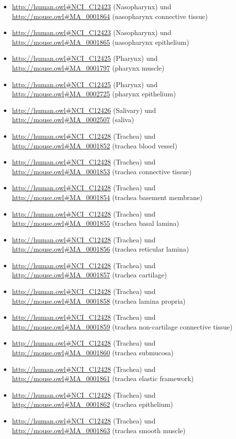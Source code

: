 \begin{itemize}
	\item \url{http://human.owl#NCI_C12423} (Nasopharynx) und \url{http://mouse.owl#MA_0001864} (nasopharynx connective tissue)
	\item \url{http://human.owl#NCI_C12423} (Nasopharynx) und \url{http://mouse.owl#MA_0001865} (nasopharynx epithelium)
	\item \url{http://human.owl#NCI_C12425} (Pharynx) und \url{http://mouse.owl#MA_0001797} (pharynx muscle)
	\item \url{http://human.owl#NCI_C12425} (Pharynx) und \url{http://mouse.owl#MA_0002725} (pharynx epithelium)
	\item \url{http://human.owl#NCI_C12426} (Salivary\textunderscoreGlund) und \url{http://mouse.owl#MA_0002507} (saliva)
	\item \url{http://human.owl#NCI_C12428} (Trachea) und \url{http://mouse.owl#MA_0001852} (trachea blood vessel)
	\item \url{http://human.owl#NCI_C12428} (Trachea) und \url{http://mouse.owl#MA_0001853} (trachea connective tissue)
	\item \url{http://human.owl#NCI_C12428} (Trachea) und \url{http://mouse.owl#MA_0001854} (trachea basement membrane)
	\item \url{http://human.owl#NCI_C12428} (Trachea) und \url{http://mouse.owl#MA_0001855} (trachea basal lamina)
	\item \url{http://human.owl#NCI_C12428} (Trachea) und \url{http://mouse.owl#MA_0001856} (trachea reticular lamina)
	\item \url{http://human.owl#NCI_C12428} (Trachea) und \url{http://mouse.owl#MA_0001857} (trachea cartilage)
	\item \url{http://human.owl#NCI_C12428} (Trachea) und \url{http://mouse.owl#MA_0001858} (trachea lamina propria)
	\item \url{http://human.owl#NCI_C12428} (Trachea) und \url{http://mouse.owl#MA_0001859} (trachea non-cartilage connective tissue)
	\item \url{http://human.owl#NCI_C12428} (Trachea) und \url{http://mouse.owl#MA_0001860} (trachea submucosa)
	\item \url{http://human.owl#NCI_C12428} (Trachea) und \url{http://mouse.owl#MA_0001861} (trachea elastic framework)
	\item \url{http://human.owl#NCI_C12428} (Trachea) und \url{http://mouse.owl#MA_0001862} (trachea epithelium)
	\item \url{http://human.owl#NCI_C12428} (Trachea) und \url{http://mouse.owl#MA_0001863} (trachea smooth muscle)

\end{itemize}
